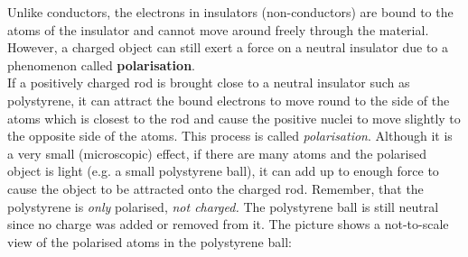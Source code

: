 Unlike conductors, the electrons in insulators (non-conductors) are bound to the atoms of the
insulator and cannot move around freely through the material. However, a charged object can still
exert a force on a neutral insulator due to a phenomenon called \textbf{polarisation}. \\
If a positively charged rod is
brought close to a neutral insulator such as polystyrene, it can attract the bound electrons
to move round to the
side of the atoms which is closest to the rod and cause the positive nuclei to move slightly
to the opposite side of the atoms. This process is called \textit{polarisation}. Although
it is a very small (microscopic) effect, if there are many atoms and the polarised object is
light (e.g. a small polystyrene ball), it can add up to enough force to cause the object to be attracted onto the
charged rod. Remember, that the polystyrene
is \textit{only} polarised, \textit{not charged.}
The polystyrene ball is still neutral since no charge was added or removed from it.
The picture shows
a not-to-scale view of the polarised atoms in the polystyrene ball:

